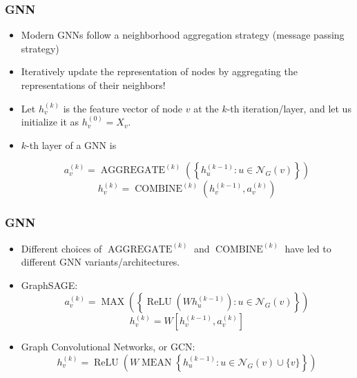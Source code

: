 \documentclass{beamer}
\DeclareMathOperator{\aggregate}{AGGREGATE}
\DeclareMathOperator{\combine}{COMBINE}
\DeclareMathOperator{\MAX}{MAX}
\DeclareMathOperator{\MEAN}{MEAN}
\DeclareMathOperator{\relu}{ReLU}
\begin{document}
\begin{frame}
\frametitle{GNN}

\begin{itemize}
	\item Modern GNNs follow a \alert{neighborhood aggregation strategy} (message passing strategy) \pause
	
	\item Iteratively update the representation of nodes by aggregating the representations of their neighbors! \pause
	
	\item Let $h_v^{(k)}$ is the feature vector of node $v$ at the $k$-th iteration/layer, and let us initialize it as $h_v^{(0)} = X_v$. \pause
	
	\item $k$-th layer of a GNN is
	
	$$a_v^{(k)} = \aggregate^{(k)} \left( \left\{ h_u^{(k - 1)} : u \in \mathcal{N}_G(v) \right\} \right)$$
	$$h_v^{(k)} = \combine^{(k)} \left( h_v^{(k - 1)}, a_v^{(k)} \right)$$
\end{itemize}

\end{frame}

\begin{frame}
\frametitle{GNN}

\begin{itemize}
	\item Different choices of $\aggregate^{(k)}$ and $\combine^{(k)}$ have led to different GNN variants/architectures. \pause
	
	\item GraphSAGE:
	$$a_v^{(k)} = \MAX \left( \left\{ \relu \left( W h_u^{(k - 1)} \right) : u \in \mathcal{N}_G(v) \right\} \right)$$
	$$h_v^{(k)} = W \left[ h_v^{(k - 1)}, a_v^{(k)} \right]$$ \pause
	
	\item Graph Convolutional Networks, or GCN:
	$$h_v^{(k)} = \relu \left( W \MEAN \left\{ h_u^{(k - 1)} : u \in \mathcal{N}_G(v) \cup \{v\} \right\} \right)$$
\end{itemize}

\end{frame}
\end{document}
